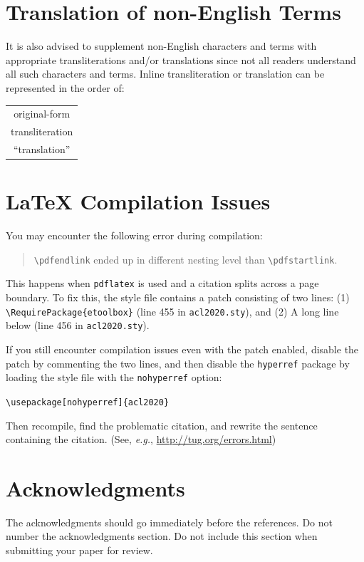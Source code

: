\documentclass[11pt,a4paper]{article}
\begin{document}
\section{Translation of non-English Terms}

It is also advised to supplement non-English characters and terms with appropriate transliterations and/or translations since not all readers understand all such characters and terms.
Inline transliteration or translation can be represented in the order of:
\begin{center}
\begin{tabular}{c}
original-form \\
transliteration \\
``translation''
\end{tabular}
\end{center}

\section{\LaTeX{} Compilation Issues}
You may encounter the following error during compilation: 
\begin{quote}
{\small\verb|\pdfendlink|} ended up in different nesting level than {\small\verb|\pdfstartlink|}.
\end{quote}
This happens when \texttt{\small pdflatex} is used and a citation splits across a page boundary.
To fix this, the style file contains a patch consisting of two lines:
(1) {\small\verb|\RequirePackage{etoolbox}|} (line 455 in \texttt{\small acl2020.sty}), and
(2) A long line below (line 456 in \texttt{\small acl2020.sty}).

If you still encounter compilation issues even with the patch enabled, disable the patch by commenting the two lines, and then disable the \texttt{\small hyperref} package by loading the style file with the \texttt{\small nohyperref} option:

\noindent
{\small\verb|\usepackage[nohyperref]{acl2020}|}

\noindent
Then recompile, find the problematic citation, and rewrite the sentence containing the citation. (See, {\em e.g.}, \url{http://tug.org/errors.html})

\section*{Acknowledgments}

The acknowledgments should go immediately before the references. Do not number the acknowledgments section.
Do not include this section when submitting your paper for review.
\end{document}
